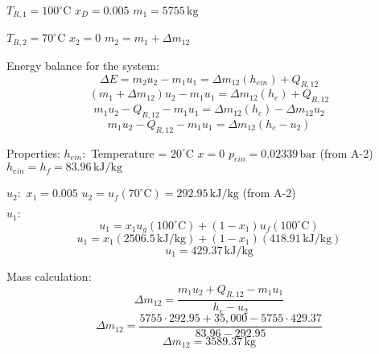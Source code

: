 \( T_{R,1} = 100^\circ \text{C} \)  
\( x_D = 0.005 \)  
\( m_1 = 5755 \, \text{kg} \)  

\( T_{R,2} = 70^\circ \text{C} \)  
\( x_2 = 0 \)  
\( m_2 = m_1 + \Delta m_{12} \)  

Energy balance for the system:  
\[
\Delta E = m_2 u_2 - m_1 u_1 = \Delta m_{12} (h_{ein}) + Q_{R,12}
\]  
\[
(m_1 + \Delta m_{12}) u_2 - m_1 u_1 = \Delta m_{12} (h_e) + Q_{R,12}
\]  
\[
m_1 u_2 - Q_{R,12} - m_1 u_1 = \Delta m_{12} (h_c) - \Delta m_{12} u_2
\]  
\[
m_1 u_2 - Q_{R,12} - m_1 u_1 = \Delta m_{12} (h_c - u_2)
\]  

Properties:  
\( h_{ein}: \)  
Temperature = \( 20^\circ \text{C} \)  
\( x = 0 \)  
\( p_{ein} = 0.02339 \, \text{bar} \) (from A-2)  
\( h_{ein} = h_f = 83.96 \, \text{kJ/kg} \)  

\( u_2: \)  
\( x_1 = 0.005 \)  
\( u_2 = u_f (70^\circ \text{C}) = 292.95 \, \text{kJ/kg} \) (from A-2)  

\( u_1: \)  
\[
u_1 = x_1 u_g (100^\circ \text{C}) + (1 - x_1) u_f (100^\circ \text{C})
\]  
\[
u_1 = x_1 (2506.5 \, \text{kJ/kg}) + (1 - x_1) (418.91 \, \text{kJ/kg})
\]  
\[
u_1 = 429.37 \, \text{kJ/kg}
\]  

Mass calculation:  
\[
\Delta m_{12} = \frac{m_1 u_2 + Q_{R,12} - m_1 u_1}{h_e - u_2}
\]  
\[
\Delta m_{12} = \frac{5755 \cdot 292.95 + 35,000 - 5755 \cdot 429.37}{83.96 - 292.95}
\]  
\[
\Delta m_{12} = 3589.37 \, \text{kg}
\]